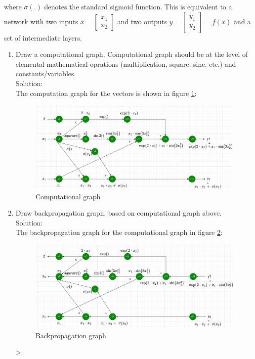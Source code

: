 \documentclass[12pt]{article}
\begin{document}
\noindent where $\sigma(.)$ denotes the standard sigmoid function. This is equivalent to a network with two inputs 
$x = 
\begin{bmatrix}
x_1\\
x_2
\end{bmatrix}
$
and two outputs 
$y = 
\begin{bmatrix}
y_1\\
y_2
\end{bmatrix} = f(x)
$
and a set of intermediate layers.
\begin{enumerate}[label=(\roman*)]

\newpage
\item Draw a computational graph. Computational graph should be at the level of elemental mathematical oprations (multiplication, square, sine, etc.) and constants/variables.\\


Solution:\\
The computation graph for the vectors is shown in figure \ref{fig:comp_graph}:

\begin{figure}[h!]
    \centering
    \includegraphics[width=\textwidth, scale=0.5]{images/Screenshot_2021-04-07 A2_571T drawio - diagrams net.png}
    \caption{Computational graph}
    \label{fig:comp_graph}
\end{figure}


\newpage

\item Draw backpropagation graph, based on computational graph above.\\

Solution:\\
The backpropagation graph for the computational graph in figure \ref{fig:back_graph}:

\begin{figure}[h!]
    \centering
    \includegraphics[width=\textwidth, scale=0.5]{images/Screenshot_2021-04-07 A2_571T drawio - diagrams net(1).png}
    \caption{Backpropagation graph}
    \label{fig:back_graph}
\end{figure}
>
\newpage


\end{enumerate}
\end{document}
